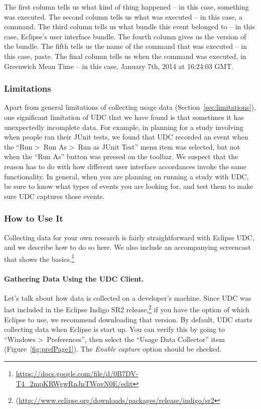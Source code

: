 \vspace{4mm}
\noindent
The first column tells us what kind of thing happened -- in this case, something was executed.
The second column tells us what was executed -- in this case, a command.
The third column tells us what bundle this event belonged to -- in this case, Eclipse's user interface bundle.
The fourth column gives us the version of the bundle.
The fifth tells us the name of the command that was executed -- in this case, paste.
The final column tells us when the command was executed, in Greenwich Mean Time -- in this case, January 7th, 2014 at 16:24:03 GMT.


\subsubsection{Limitations}

Apart from general limitations of collecting usage data (Section~\ref{sec:limitations}),
one significant limitation of UDC that we have found is that sometimes it has
unexpectedly incomplete data.
For example, in planning for a study involving when people ran their JUnit tests,
we found that UDC recorded an event when the ``Run \textgreater~Run As \textgreater~Run as JUnit Test'' menu item was selected,
but not when the ``Run As'' button was pressed on the toolbar.
We suspect that the reason has to do with how different user interface accordances
invoke the same functionality.
In general, when you are planning on running a study with UDC, be sure to know what
types of events you are looking for, and test them to make sure UDC captures those events.

\subsubsection{How to Use It}

\label{SecUDCHowToUseIt}

Collecting data for your own research is fairly straightforward with Eclipse UDC,
and we describe how to do so here.
We also include an accompanying screencast that shows the
basics.\footnote{\url{https://docs.google.com/file/d/0B7DV-T4_2mpKRWgwRnJnTWpvN0E/edit}}

\paragraph{Gathering Data Using the UDC Client.}

Let's talk about how data is collected on a developer's machine.
Since UDC was last included in the Eclipse Indigo SR2
release,\footnote{(\url{http://www.eclipse.org/downloads/packages/release/indigo/sr2}}
if you have the option of which Eclipse to use, we recommend downloading
that version.
By default, UDC starts collecting data when Eclipse is start up.
You can verify this by going to ``Windows \textgreater~Preferences'', then
select the ``Usage Data Collector'' item (Figure~\ref{fig:prefPage1}).
The \textit{Enable capture} option should be checked.

